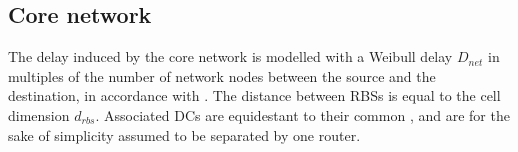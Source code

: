 \subsection{Core network}
The delay induced by the core network is modelled with a Weibull delay $D_{net}$ in multiples of the number of network nodes between the source and the destination, in accordance with \cite{papagiannaki2003measurement}. The distance between \ac{RBS}s is equal to the cell dimension $d_{rbs}$. Associated \ac{DC}s are equidestant to their common , and are for the sake of simplicity assumed to be separated by one router.
